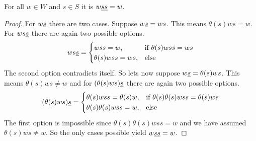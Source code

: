\begin{lemm}
	For all $w \in W$ and $s \in S$ it is $w \underline{ss} = w$.

	\begin{proof}
		For $w \underline{s}$ there are two cases. Suppose $w \underline{s} = ws$. This means $\theta(s)ws = w$. For $ws \underline{s}$ there are again two possible options.
		$$ ws \underline{s} = \begin{cases}
			wss = w, & \textrm{if } \theta(s)wss = ws \\
			\theta(s)wss = ws, & \textrm{else} \\
		\end{cases} $$
		The second option contradicts itself. So lets now suppose $w \underline{s} = \theta(s)ws$. This means $\theta(s)ws \neq w$ and for $(\theta(s)ws) \underline{s}$ there are again two possible options.
		$$ (\theta(s)ws) \underline{s} = \begin{cases}
			\theta(s)wss = \theta(s)w, & \textrm{if } \theta(s) \theta(s) w ss = \theta(s) w s \\
			\theta(s)\theta(s)wss = w, & \textrm{else} \\
		\end{cases} $$
		The first option is impossible since $\theta(s) \theta(s) w ss = w$ and we have assumed $\theta(s)ws \neq w$. So the only cases possible yield $w \underline{s} \underline{s} = w$.
	\end{proof}
\end{lemm}